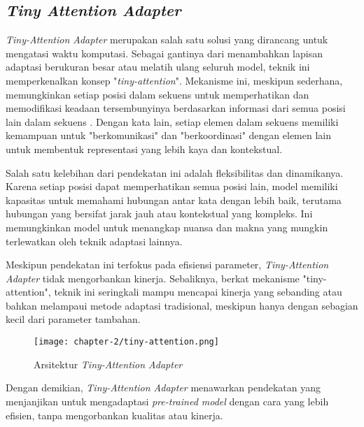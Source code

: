 \subsection{\textit{Tiny Attention Adapter}}

\textit{Tiny-Attention Adapter} merupakan salah satu solusi yang dirancang untuk mengatasi waktu komputasi. Sebagai gantinya dari menambahkan lapisan adaptasi berukuran besar atau melatih ulang seluruh model, teknik ini memperkenalkan konsep "\textit{tiny-attention}". Mekanisme ini, meskipun sederhana, memungkinkan setiap posisi dalam sekuens untuk memperhatikan dan memodifikasi keadaan tersembunyinya berdasarkan informasi dari semua posisi lain dalam sekuens \parencite{tinyattention}. Dengan kata lain, setiap elemen dalam sekuens memiliki kemampuan untuk "berkomunikasi" dan "berkoordinasi" dengan elemen lain untuk membentuk representasi yang lebih kaya dan kontekstual.

Salah satu kelebihan dari pendekatan ini adalah fleksibilitas dan dinamikanya. Karena setiap posisi dapat memperhatikan semua posisi lain, model memiliki kapasitas untuk memahami hubungan antar kata dengan lebih baik, terutama hubungan yang bersifat jarak jauh atau kontekstual yang kompleks. Ini memungkinkan model untuk menangkap nuansa dan makna yang mungkin terlewatkan oleh teknik adaptasi lainnya.

Meskipun pendekatan ini terfokus pada efisiensi parameter, \textit{Tiny-Attention Adapter} tidak mengorbankan kinerja. Sebaliknya, berkat mekanisme "tiny-attention", teknik ini seringkali mampu mencapai kinerja yang sebanding atau bahkan melampaui metode adaptasi tradisional, meskipun hanya dengan sebagian kecil dari parameter tambahan.

\begin{figure}[ht]
    \centering
    \texttt{[image: chapter-2/tiny-attention.png]}
    \caption{Arsitektur \textit{Tiny-Attention Adapter}}
    \label{fig:tiny-attention}
\end{figure}

Dengan demikian, \textit{Tiny-Attention Adapter} menawarkan pendekatan yang menjanjikan untuk mengadaptasi \textit{pre-trained model} dengan cara yang lebih efisien, tanpa mengorbankan kualitas atau kinerja.